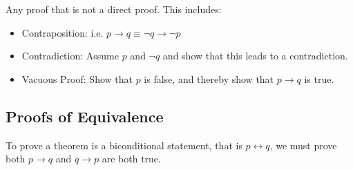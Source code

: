 \documentclass[12pt letter]{report}
\begin{document}
Any proof that is not a direct proof. This includes:

\begin{itemize}
	\item Contraposition: i.e. $p \to q \equiv \neg q \to \neg p$
	\item Contradiction: Assume $p$ and $\neg q$ and show that this leads to a contradiction.
	\item Vacuous Proof: Show that $p$ is false, and thereby show that $p \to q$ is true.
\end{itemize}



\subsection{Proofs of Equivalence}

To prove a theorem is a biconditional statement, that is $p \leftrightarrow q$, we must prove both $p \to q$ and $q \to
	p$ are both true.
\end{document}
